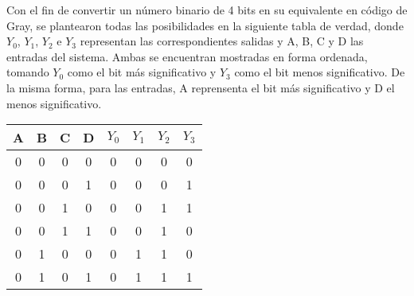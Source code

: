 \noindent
Con el fin de convertir un número binario de 4 bits en su equivalente en código de Gray, se plantearon todas las posibilidades en la siguiente tabla de verdad, donde $Y_0$, $Y_1$, $Y_2$ e $Y_3$ representan las correspondientes salidas y A, B, C y D las entradas del sistema. Ambas se encuentran mostradas en forma ordenada, tomando $Y_0$ como el bit m\'as significativo y $Y_3$ como el bit menos significativo. De la misma forma, para las entradas, A reprensenta el bit m\'as significativo y D el menos significativo.

\begin{table}[h!]
\centering
\begin{tabular}{|cccc|cccc|}
\hline

\multicolumn{1}{|c|}{A} & \multicolumn{1}{c|}{B}   & \multicolumn{1}{c|}{C}   & D                        & \multicolumn{1}{c|}{$Y_0$}   & \multicolumn{1}{c|}{$Y_1$}   & \multicolumn{1}{c|}{$Y_2$}   & $Y_3$                        \\ \hline
\rowcolor[HTML]{34FF34} 
0                       & 0                        & 0                        & 0                        & \cellcolor[HTML]{FD6864}0 & \cellcolor[HTML]{FD6864}0 & \cellcolor[HTML]{FD6864}0 & \cellcolor[HTML]{FD6864}0 \\
\rowcolor[HTML]{34FF34} 
0                       & 0                        & 0                        & 1                        & \cellcolor[HTML]{FD6864}0 & \cellcolor[HTML]{FD6864}0 & \cellcolor[HTML]{FD6864}0 & \cellcolor[HTML]{FD6864}1 \\
\rowcolor[HTML]{34FF34} 
0                       & 0                        & 1                        & 0                        & \cellcolor[HTML]{FD6864}0 & \cellcolor[HTML]{FD6864}0 & \cellcolor[HTML]{FD6864}1 & \cellcolor[HTML]{FD6864}1 \\
\rowcolor[HTML]{34FF34} 
0                       & {\color[HTML]{333333} 0} & {\color[HTML]{333333} 1} & {\color[HTML]{333333} 1} & \cellcolor[HTML]{FD6864}0 & \cellcolor[HTML]{FD6864}0 & \cellcolor[HTML]{FD6864}1 & \cellcolor[HTML]{FD6864}0 \\
\rowcolor[HTML]{34FF34} 
0                       & {\color[HTML]{333333} 1} & {\color[HTML]{333333} 0} & {\color[HTML]{333333} 0} & \cellcolor[HTML]{FD6864}0 & \cellcolor[HTML]{FD6864}1 & \cellcolor[HTML]{FD6864}1 & \cellcolor[HTML]{FD6864}0 \\
\rowcolor[HTML]{34FF34} 
0                       & {\color[HTML]{333333} 1} & {\color[HTML]{333333} 0} & {\color[HTML]{333333} 1} & \cellcolor[HTML]{FD6864}0 & \cellcolor[HTML]{FD6864}1 & \cellcolor[HTML]{FD6864}1 & \cellcolor[HTML]{FD6864}1 \\

\end{tabular}
\end{table}
